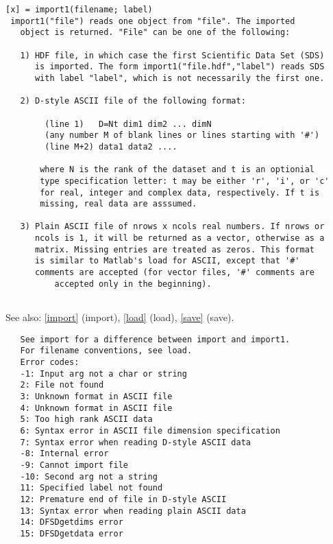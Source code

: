 \documentclass[a4paper]{article}
\begin{document}
\begin{tscreen}
\begin{verbatim}
[x] = import1(filename; label)
 import1("file") reads one object from "file". The imported
   object is returned. "File" can be one of the following:

   1) HDF file, in which case the first Scientific Data Set (SDS)
      is imported. The form import1("file.hdf","label") reads SDS
      with label "label", which is not necessarily the first one.

   2) D-style ASCII file of the following format:

        (line 1)   D=Nt dim1 dim2 ... dimN
        (any number M of blank lines or lines starting with '#')
        (line M+2) data1 data2 ....

       where N is the rank of the dataset and t is an optionial
       type specification letter: t may be either 'r', 'i', or 'c'
       for real, integer and complex data, respectively. If t is
       missing, real data are asssumed.

   3) Plain ASCII file of nrows x ncols real numbers. If nrows or
      ncols is 1, it will be returned as a vector, otherwise as a
      matrix. Missing entries are treated as zeros. This format
      is similar to Matlab's load for ASCII, except that '#'
      comments are accepted (for vector files, '#' comments are
          accepted only in the beginning).
       
\end{verbatim}

See also: \ref{import} {(import)}, \ref{load} {(load)}, \ref{save} {(save)}.
\begin{verbatim}
   See import for a difference between import and import1.
   For filename conventions, see load.
   Error codes:
   -1: Input arg not a char or string
   2: File not found
   3: Unknown format in ASCII file
   4: Unknown format in ASCII file
   5: Too high rank ASCII data
   6: Syntax error in ASCII file dimension specification
   7: Syntax error when reading D-style ASCII data
   -8: Internal error
   -9: Cannot import file
   -10: Second arg not a string
   11: Specified label not found
   12: Premature end of file in D-style ASCII
   13: Syntax error when reading plain ASCII data
   14: DFSDgetdims error
   15: DFSDgetdata error
   
\end{verbatim}
\end{tscreen}
\end{document}
